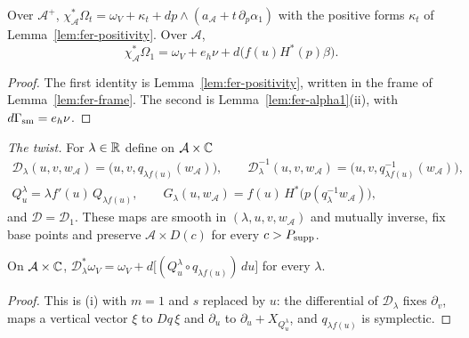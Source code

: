 \begin{lemma}\label{lem:shd4-frame-forms}
Over $\mathcal A^+$, $\chi_{\mathcal A}^*\Omega_t=\omega_V+\kappa_t+dp\wedge(a_{\mathcal A}+t\,\partial_p\alpha_1)$ with the positive forms
$\kappa_t$ of Lemma~\ref{lem:fer-positivity}. Over $\mathcal A$,
\[
 \chi_{\mathcal A}^*\Omega_1=\omega_V+e_h\nu+d\bigl(f(u)H^*(p)\beta\bigr).
\]
\end{lemma}

\begin{proof}
The first identity is Lemma~\ref{lem:fer-positivity}, written in the frame of Lemma~\ref{lem:fer-frame}. The second
is Lemma~\ref{lem:fer-alpha1}(ii), with $d\Gamma_{\rm sm}=e_h\nu$.
\end{proof}

\emph{The twist.} For $\lambda\in\mathbb{R}$ define on $\mathcal A\times\mathbb{C}$
\begin{equation}\label{eq:shd4-twist}
\begin{gathered}
 \mathcal D_\lambda(u,v,w_{\mathcal A})=\bigl(u,v,q_{\lambda f(u)}(w_{\mathcal A})\bigr),\qquad
 \mathcal D_\lambda^{-1}(u,v,w_{\mathcal A})=\bigl(u,v,q^{-1}_{\lambda f(u)}(w_{\mathcal A})\bigr),\\
 Q^\lambda_u=\lambda f'(u)\,Q_{\lambda f(u)},\qquad G_\lambda(u,w_{\mathcal A})=f(u)\,H^*\bigl(p(q_\lambda^{-1}w_{\mathcal A})\bigr),
\end{gathered}
\end{equation}
and $\mathcal D=\mathcal D_1$. These maps are smooth in $(\lambda,u,v,w_{\mathcal A})$ and mutually inverse, fix base points and
preserve $\mathcal A\times D(c)$ for every $c>P_{\rm supp}$.

\begin{lemma}[Suspension]\label{lem:shd4-suspension}
On $\mathcal A\times\mathbb{C}$, $\mathcal D_\lambda^*\omega_V=\omega_V+d\bigl[(Q^\lambda_u\circ q_{\lambda f(u)})\,du\bigr]$ for every $\lambda$.
\end{lemma}

\begin{proof}
This is (i) with $m=1$ and $s$ replaced by $u$: the differential of $\mathcal D_\lambda$ fixes
$\partial_v$, maps a vertical vector $\xi$ to $Dq\,\xi$ and $\partial_u$ to $\partial_u+X_{Q^\lambda_u}$, and $q_{\lambda f(u)}$ is symplectic.
\end{proof}

